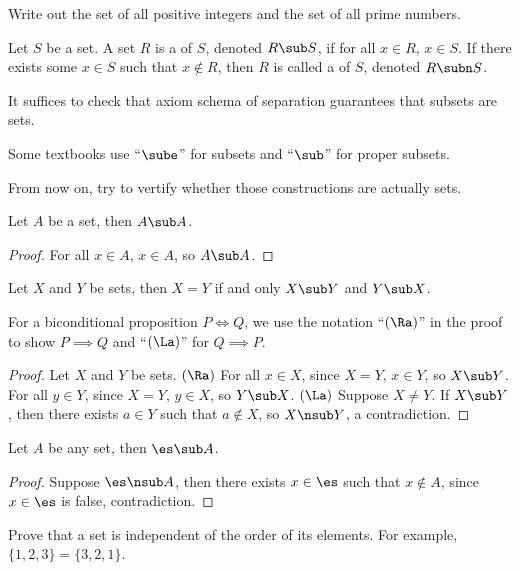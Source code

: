 \documentclass[10pt]{article}
\begin{document}
\begin{problem}
    Write out the set of all positive integers and the set of all prime numbers.
\end{problem}
\begin{definition}
    Let $S$ be a set. A set $R$ is a  of $S$, denoted $R\sub S$, if for all $x\in R$, $x\in S$. If there exists some $x\in S$ such that $x\notin R$, then $R$ is called a  of $S$, denoted $R\subn S$.
\end{definition}
\par
It suffices to check that axiom schema of separation guarantees that subsets are sets.
\begin{remark}
    Some textbooks use ``$\sube$'' for subsets and ``$\sub$'' for proper subsets.
\end{remark}
\begin{remark}
    From now on, try to vertify whether those constructions are actually sets.
\end{remark}
\begin{proposition}
    Let $A$ be a set, then $A\sub A$.
\end{proposition}
\begin{proof}
    For all $x\in A$, $x\in A$, so $A\sub A$. 
\end{proof}
\begin{proposition}
    Let $X$ and $Y$ be sets, then $X=Y$ if and only $X\sub Y$ and $Y\sub X$.
\end{proposition}
\begin{remark}
    For a biconditional proposition $P\iff Q$, we use the notation ``$(\Ra)$'' in the proof to show $P\implies Q$ and ``$(\La)$'' for $Q\implies P$.
\end{remark}
\begin{proof}
    Let $X$ and $Y$ be sets. $(\Ra)$ For all $x\in X$, since $X=Y$, $x\in Y$, so $X\sub Y$. For all $y\in Y$, since $X=Y$, $y\in X$, so $Y\sub X$. $(\La)$ Suppose $X\ne Y$. If $X\sub Y$, then there exists $a\in Y$ such that $a\notin X$, so $X\nsub Y$, a contradiction.
\end{proof}
\begin{proposition}
    Let $A$ be any set, then $\es\sub A$.
\end{proposition}
\begin{proof}
    Suppose $\es\nsub A$, then there exists $x\in\es$ such that $x\notin A$, since $x\in\es$ is false, contradiction.
\end{proof}
\begin{problem}
    Prove that a set is independent of the order of its elements. For example, $\{1,2,3\}=\{3,2,1\}$.
\end{problem}
\end{document}
